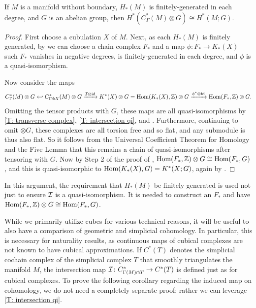 \begin{corollary}\label{C: cohomology with coefficients}
	If $M$ is a manifold without boundary, $H_*(M)$ is finitely-generated in each degree, and $G$ is an abelian group, then $H^*(C^*_\Gamma(M) \otimes G) \cong H^*(M; G)$.
\end{corollary}
\begin{proof}
	First choose a cubulation $X$ of $M$.
	Next, as each $H_*(M)$ is finitely generated, by \cite[Lemma 56.3 and Theorem 45.1]{Mun84} we can choose a chain complex $F_*$ and a map $\phi \colon F_* \to K_*(X)$ such $F_*$ vanishes in negative degrees, is finitely-generated in each degree, and $\phi$ is a quasi-isomorphism.

	Now consider the maps
	$$C^*_\Gamma(M) \otimes G \hookleftarrow C^*_{\Gamma \pitchfork X}(M) \otimes G \xrightarrow{\mathcal{I} \otimes \mathrm{id}} K^*(X) \otimes G = \textup{Hom}(K_*(X),\mathbb{Z})\otimes G \xrightarrow{\phi^* \otimes \mathrm{id}} \textup{Hom}(F_*, \mathbb{Z}) \otimes G.$$
	Omitting the tensor products with $G$, these maps are all quasi-isomorphisms by \cref{T: transverse complex}, \cref{T: intersection qi}, and \cite[Theorem 45.5]{Mun84}.
	Furthermore, continuing to omit $\otimes G$, these complexes are all torsion free and so flat, and any submodule is thus also flat.
	So it follows from the Universal Coefficient Theorem for Homology \cite[Theorem 7.55 ]{ROTMAN} and the Five Lemma that this remains a chain of quasi-isomorphisms after tensoring with $G$.
	Now by Step 2 of the proof of \cite[Theorem 56.1]{Mun84}, $\textup{Hom}(F_*, \mathbb{Z}) \otimes G \cong \textup{Hom}(F_*, G)$, and this is quasi-isomorphic to $\textup{Hom}(K_*(X), G) = K^*(X; G)$, again by \cite[Theorem 45.5]{Mun84}.
\end{proof}

In this argument, the requirement that $H_*(M)$ be finitely generated is used not just to ensure $\mathcal{I}$ is a quasi-isomorphism.
It is needed to construct an $F_*$ and have $\textup{Hom}(F_*, \mathbb{Z}) \otimes G \cong \textup{Hom}(F_*, G)$.

While we primarily utilize cubes for various technical reasons, it will be useful to also have a comparison of geometric and simplicial cohomology.
In particular, this is necessary for naturality results, as continuous maps of cubical complexes are not known to have cubical approximations.
If $C^*(T)$ denotes the simplicial cochain complex of the simplicial complex $T$ that smoothly triangulates the manifold $M$, the intersection map $\mathcal{I} \colon C^*_{\Gamma(M) \pitchfork T} \to C^*(T)$ is defined just as for cubical complexes.
To prove the following corollary regarding the induced map on cohomology, we do not need a completely separate proof; rather we can leverage \cref{T: intersection qi}.

